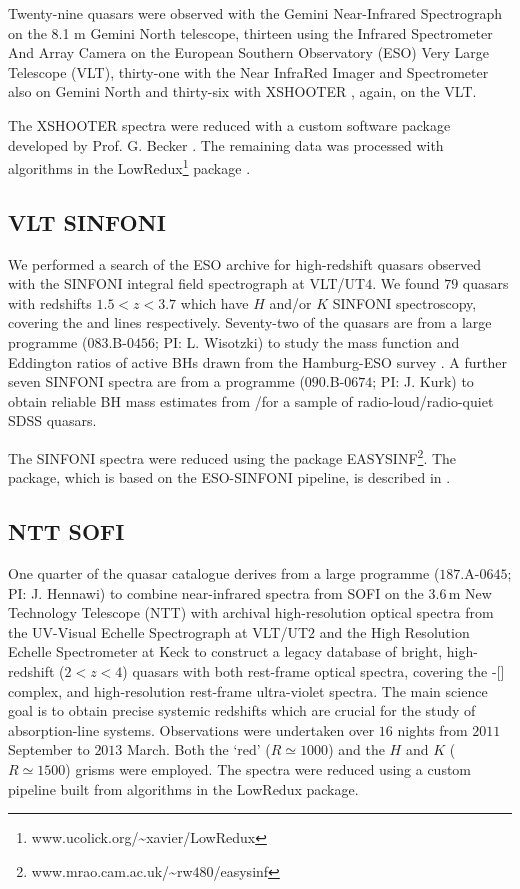 Twenty-nine quasars were observed with the Gemini Near-Infrared Spectrograph \citep[GNIRS;][]{elias06} on the 8.1 m Gemini North telescope, thirteen using the Infrared Spectrometer And Array Camera \citep[ISAAC;][]{moorwood98b} on the European Southern Observatory (ESO) Very Large Telescope (VLT), thirty-one with the Near InfraRed Imager and Spectrometer \citep[NIRI;][]{hodapp03} also on Gemini North and thirty-six with XSHOOTER \citep{vernet11}, again, on the VLT. 

The  XSHOOTER  spectra  were  reduced  with  a  custom  software  package  developed  by  Prof. G. Becker \citep[for details, see][]{lau16}. 
The remaining data was processed with algorithms in the LowRedux\footnote{www.ucolick.org/\textasciitilde xavier/LowRedux} package \citep[see][]{prochaska09}.

\subsection{VLT SINFONI}

We performed a search of the ESO archive for high-redshift quasars observed with the SINFONI  integral  field  spectrograph \citep{eisenhauer03,bonnet04} at VLT/UT$4$.
We found $79$ quasars with redshifts $1.5 < z < 3.7$ which have $H$ and/or $K$ SINFONI spectroscopy, covering the \hb and \ha lines respectively. 
Seventy-two of the quasars are from a large programme ($083$.B-$0456$; PI: L. Wisotzki) to study the mass function and Eddington ratios of active BHs drawn from the Hamburg-ESO survey \citep{wisotzki00}.
A further seven SINFONI spectra are from a programme ($090$.B-$0674$; PI: J. Kurk) to obtain reliable BH mass estimates from \hans/\hb for a sample of radio-loud/radio-quiet SDSS quasars.

The SINFONI spectra were reduced using the package EASYSINF\footnote{www.mrao.cam.ac.uk/\textasciitilde rw$480$/easysinf}.  
The package, which is based on the ESO-SINFONI pipeline, is described in \citet{williams16}. 

\subsection{NTT SOFI}

One quarter of the quasar catalogue derives from a large programme ($187$.A-$0645$; PI: J. Hennawi) to combine near-infrared spectra from SOFI \citep{moorwood98a} on the $3.6$\,m New Technology Telescope (NTT) with archival high-resolution optical spectra from the UV-Visual Echelle Spectrograph \citep[UVES;][]{dekker00} at VLT/UT$2$ and the High Resolution Echelle Spectrometer \citep[HIRES;][]{vogt94} at Keck to construct a legacy database of bright, high-redshift ($2 < z < 4$) quasars with both rest-frame optical spectra, covering the \hbns-[] complex, and high-resolution rest-frame ultra-violet spectra.
The main science goal is to obtain precise systemic redshifts which are crucial for the study of absorption-line systems.  
Observations were undertaken over $16$ nights from $2011$ September to $2013$ March.
Both the `red' ($R \simeq 1000$) and the $H$ and $K$ ($R \simeq 1500$) grisms were employed. 
The spectra were reduced using a custom pipeline built from algorithms in the LowRedux package.

